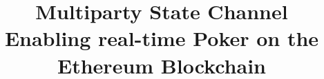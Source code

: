 \documentclass[conference]{IEEEtran}
\begin{document}
%
\title{Multiparty State Channel\\ Enabling real-time Poker on the Ethereum Blockchain}


\author{
{}
}


% 
\end{document}
